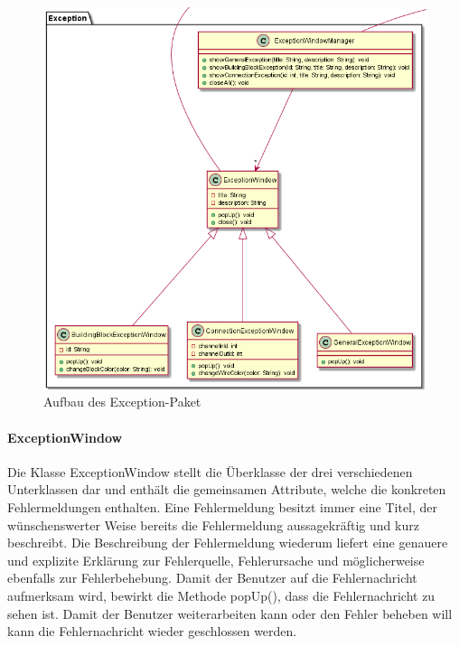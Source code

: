 \documentclass[parskip=full]{scrartcl}
\begin{document}
\begin{figure}[htbp]
	\begin{center}
		\includegraphics[width = 14cm]{Grafiken/ExceptionNamespace.png}
		\caption{Aufbau des Exception-Paket}
		\label{Entwurf_Grob}
	\end{center}
\end{figure}

\paragraph{ExceptionWindow}

Die Klasse ExceptionWindow stellt die Überklasse der drei verschiedenen Unterklassen dar und enthält die gemeinsamen Attribute, welche die konkreten Fehlermeldungen enthalten. Eine Fehlermeldung besitzt immer eine Titel, der wünschenswerter Weise bereits die Fehlermeldung aussagekräftig und kurz beschreibt. Die Beschreibung der Fehlermeldung wiederum liefert eine genauere und explizite Erklärung zur Fehlerquelle, Fehlerursache und möglicherweise ebenfalls zur Fehlerbehebung.
Damit der Benutzer auf die Fehlernachricht aufmerksam wird, bewirkt die Methode popUp(), dass die Fehlernachricht zu sehen ist. Damit der Benutzer weiterarbeiten kann oder den Fehler beheben will kann die Fehlernachricht wieder geschlossen werden.
\end{document}
